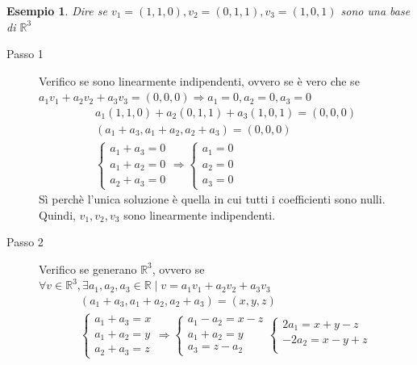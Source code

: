 \documentclass[a4paper]{article}
\theoremstyle{definition}
\newtheorem*{es}{Esempio}
\begin{document}
\begin{es}
	\textit{Dire se $v_1 = (1, 1, 0), v_2 = (0, 1, 1), v_3 = (1, 0, 1)$ sono una base di $\mathbb{R}^3$}
	\indent \begin{description}
		\item[Passo 1] Verifico se sono linearmente indipendenti, ovvero se è vero che se $a_1v_1 + a_2v_2 + a_3v_3 = (0, 0, 0) \Rightarrow a_1 = 0, a_2 = 0, a_3 = 0$
		      \begin{align*}
			      a_1(1, 1, 0) + a_2(0, 1, 1) + a_3(1, 0, 1) = (0, 0, 0) \\
			      (a_1 + a_3, a_1 + a_2, a_2 + a_3) = (0, 0, 0)          \\
			      \begin{cases}
				      a_1 + a_3 = 0 \\
				      a_1 + a_2 = 0 \\
				      a_2 + a_3 = 0
			      \end{cases}
			      \Rightarrow
			      \begin{cases}
				      a_1 = 0 \\
				      a_2 = 0 \\
				      a_3 = 0
			      \end{cases}
		      \end{align*}
		      Sì perchè l'unica soluzione è quella in cui tutti i coefficienti sono nulli. Quindi, $v_1, v_2, v_3$ sono linearmente indipendenti.
		\item[Passo 2] Verifico se generano $\mathbb{R}^3$, ovvero se $\forall v \in \mathbb{R}^3, \exists a_1, a_2, a_3 \in \mathbb{R} \mid v = a_1v_1 + a_2v_2 + a_3v_3$
		      \begin{align*}
			      (a_1 + a_3, a_1 + a_2, a_2 + a_3) = (x, y, z) \\
			      \begin{cases}
				      a_1 + a_3 = x \\
				      a_1 + a_2 = y \\
				      a_2 + a_3 = z
			      \end{cases}
			      \Rightarrow
			      \begin{cases}
				      a_1 - a_2 = x - z \\
				      a_1 + a_2 = y     \\
				      a_3 = z - a_2
			      \end{cases}
			      \begin{cases}
				      2a_1 = x + y - z   \\
				      - 2a_2 = x - y + z \\

\end{cases}
\end{align*}
\end{description}
\end{es}
\end{document}
